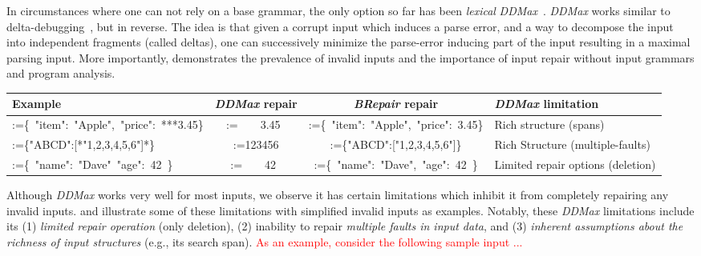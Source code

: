 \documentclass[sigconf,review,anonymous]{acmart}
\makeatletter
\newcounter{todocounter}
\newcommand{\todo}[1]{\marginpar{$|$}\textcolor{red}{\stepcounter{todocounter}\footnote[\thetodocounter]{\textcolor{red}{\textbf{TODO }}\textit{#1}}}}
\newcommand{\recheck}[1]{\textcolor{red}{#1}}
\renewcommand{\todo}[1]{}
\newcommand{\approach}{\textsc{BRepair}\xspace}
\newcommand{\ddmax}{\textit{DDMax}\xspace}
\newcommand{\brepair}{\textit{BRepair}\xspace}
\newcommand\letterboxed[1]{%
\setlength{\fboxsep}{0pt}%
  \@tfor\@ii:=#1\do{%
    \fcolorbox{white}{light-gray}{\texttt{\strut\@ii}}%
  }%
}
\makeatother
\begin{document}
In circumstances where one can not rely on a base grammar, the only option so far
has been \textit{lexical} \ddmax~\cite{kirschner2020debugging}. \ddmax works similar to
delta-debugging~\cite{zeller2002simplifying}, but in reverse. The idea
is that given a corrupt input which induces a parse error, and a way to
decompose the input into independent fragments (called deltas), one can
successively minimize the parse-error inducing part of the input resulting in a
maximal parsing input. 
More importantly, \citet{kirschner2020debugging} demonstrates the prevalence of invalid inputs and the importance of input repair without input grammars and program analysis.


\begin{table*}\centering
\footnotesize
\caption{\ddmax vs. \approach: examples showing limitations of \ddmax and the strengths of \approach}
\begin{tabular}{|l | c | c | l |}
\hline
Example & \ddmax repair & \brepair repair & \ddmax limitation \\
\hline
\letterboxed{\{\ "item":\ "Apple",\ "price":\ ***3.45\}} & \letterboxed{\ \ \ \
3.45\ } & \letterboxed{\{\ "item":\ "Apple",\ "price":\ 3.45\}} & Rich structure
(spans) \\
\letterboxed{\{"ABCD":[*"1,2,3,4,5,6"]*\}} & 
\letterboxed{123456} & 
\letterboxed{\{"ABCD":["1,2,3,4,5,6"]\}} & 
Rich Structure (multiple-faults) \\
\letterboxed{\{\ "name":\ "Dave"\ "age":\ 42\ \}} &
\letterboxed{\ \ \ \ 42\ }  &
\letterboxed{\{\ "name":\ "Dave",\ "age":\ 42\ \}} &
Limited repair options (deletion) \\
\hline
\end{tabular}
\label{tab:ddmaxlimitations}
\end{table*}


Although \ddmax works very well for most inputs, %
we observe it %
has certain limitations which inhibit it from completely repairing any invalid inputs. %
\Cref{tab:ddmaxlimitations} and \Cref{motivation} illustrate some of these limitations with simplified invalid inputs as examples. 
Notably, these \ddmax limitations include its (1) \textit{limited repair operation} (only deletion), (2) inability to repair \textit{multiple faults in input data}, and (3)
\textit{inherent assumptions about the richness of input structures} (e.g., its search span).
\recheck{
As an example, consider the following sample input ...\todo{we need to decide the most important limitation to buttress with an example here ... I think one that requires insertion and incompleteness error-feedback is the most important differentiator, or a hybrid example that also contains multiple faults ... } \todo{it should also be the same example to motivate and illustrate the way \brepair works (after the par. )}
}
\end{document}
